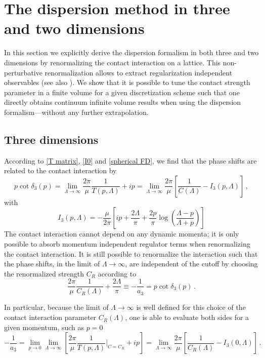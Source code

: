 \section{The dispersion method in three and two dimensions}\label{sec:3D dispersion}
In this section we explicitly derive the dispersion formalism in both three and two dimensions by renormalizing the contact interaction on a lattice.
This non-perturbative renormalization allows to extract regularization independent observables (see also \cite{Epelbaum:2018zli}).
We show that it is possible to tune the contact strength parameter in a finite volume for a given discretization scheme such that one directly obtains continuum infinite volume results when using the dispersion formalism---without any further extrapolation.

\subsection{Three dimensions}

According to \eqref{T matrix}, \eqref{I0} and \eqref{spherical FD}, we find that the phase shifts are related to the contact interaction by
\begin{equation}\label{eq:blah blah}
	p \cot \delta_3(p)
	= \lim\limits_{\Lambda \to \infty}\frac{2 \pi}{\mu}\frac{1}{T(p, \Lambda)} + i p
	= \lim\limits_{\Lambda \to \infty}
		\frac{2 \pi}{\mu} \left[
			\frac{1}{C(\Lambda)} - I_3(p, \Lambda)
		\right]
	\, ,
\end{equation}
with
\begin{equation}
	I_3(p, \Lambda)
	=
	-\frac{\mu}{2 \pi}
	\left[
	i p + \frac{2 \Lambda}{\pi} + \frac{2  p}{\pi} \log \left( \frac{\Lambda - p}{\Lambda + p}\right)
	\right]
\end{equation}
The contact interaction cannot depend on any dynamic momenta; it is only possible to absorb momentum independent regulator terms when renormalizing the contact interaction.
It is still possible to renormalize the interaction such that the phase shifts, in the limit of $\Lambda \to \infty$, are independent of the cutoff by choosing the renormalized strength $C_R$ according to
\begin{equation}\label{eq:three-d-counterterm}
	\frac{2 \pi}{\mu} \frac{1}{C_R(\Lambda)} + \frac{2 \Lambda}{\pi}
	\equiv
	- \frac{1}{a_3}
	=
	p \cot \delta_3(p)
	\, .
\end{equation}

In particular, because the limit of $\Lambda \to \infty$ is well defined for this choice of the contact interaction parameter $C_R(\Lambda)$, one is able to evaluate both sides for a given momentum, such as $p=0$
\begin{equation}
	- \frac{1}{a_3}
	=
	\lim\limits_{p \to 0}\lim\limits_{\Lambda \to \infty}
		\left[
			\frac{2 \pi}{\mu}\frac{1}{T(p, \Lambda)} \bigg|_{C=C_R} + i p
	\right]
	=
	\lim\limits_{\Lambda \to \infty}
	\frac{2 \pi}{\mu}
		\left[
		\frac{1}{C_R(\Lambda)} - I_3(0, \Lambda)
		\right]
	\, .
\end{equation}

